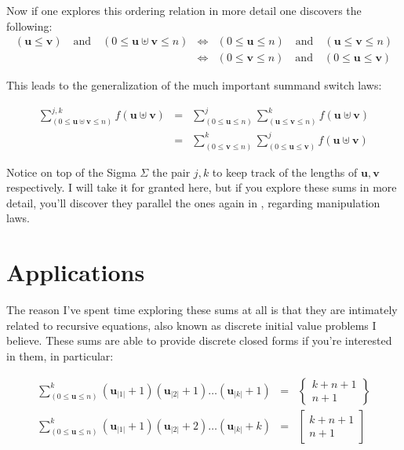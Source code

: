 \documentclass[twoside]{amsart}
\newcommand{\bu}[1][u]{\ensuremath{\mathbf #1}}
\begin{document}
Now if one explores this ordering relation in more detail one discovers the following:
\begin{eqnarray*}
(\bu\le\bu[v])\quad\mbox{and}\quad(0\le\bu\uplus\bu[v]\le n)
 & \iff & (0\le\bu\le n)\quad\mbox{and}\quad(\bu\le\bu[v]\le n)                  \\
 & \iff & (0\le\bu[v]\le n)\quad\mbox{and}\quad(0\le\bu\le\bu[v])
\end{eqnarray*} 

This leads to the generalization of the much important summand switch laws:

\begin{eqnarray*}
\sum_{(0\le\bu\uplus\bu[v]\le n)}^{j,k}                                       
       \!\!\!\!\!\!\!\!\! f(\bu\uplus\bu[v])                                 
 & = & \sum_{(0\le\bu\le n)}^j                                           
       \sum_{(\bu\le\bu[v]\le n)}^k\!\!\!\!\!\! f(\bu\uplus\bu[v])     \\  
 & = & \sum_{(0\le\bu[v]\le n)}^k                                          
       \sum_{(0\le\bu\le\bu[v])}^j\!\!\!\!\!\! f(\bu\uplus\bu[v])       
\end{eqnarray*}

Notice on top of the Sigma $ \Sigma $ the pair $ j, k $ to keep track of the lengths of $ \bu, \bu[v] $ respectively.
I will take it for granted here, but if you explore these sums in more detail, you'll discover they parallel the ones
again in \cite{gkp}, regarding manipulation laws.

\section{Applications}

The reason I've spent time exploring these sums at all is that they are intimately related to recursive equations,
also known as discrete initial value problems I believe.  These sums are able to provide discrete closed forms
if you're interested in them, in particular:

\begin{eqnarray*}
\sum_{(0\le\bu\le n)}^k\!\!\!\!\!
	(\bu_{|1|}+1)(\bu_{|2|}+1)\ldots(\bu_{|k|}+1)
 & = & \left\{\!\!\!\begin{array}{c} k+n+1 \\ n+1 \end{array}\!\!\!\right\} \\
\sum_{(0\le\bu\le n)}^k\!\!\!\!\!
	(\bu_{|1|}+1)(\bu_{|2|}+2)\ldots(\bu_{|k|}+k)
 & = & \left[\!\!\!\begin{array}{c} k+n+1 \\ n+1 \end{array}\!\!\!\right]   
\end{eqnarray*}
\end{document}
